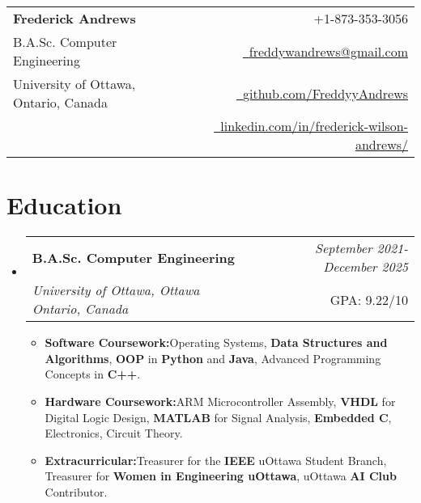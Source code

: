 \documentclass[a4paper,11pt]{article}
\makeatletter
\newcommand{\resumeItem}[2]{
  \item{
    \textbf{#1}{\hspace{0.5mm}#2 \vspace{-0.5mm}}
  }
}
\newcommand{\resumeSubheading}[4]{
\vspace{0.5mm}\item
    \begin{tabular*}{0.98\textwidth}[t]{l@{\extracolsep{\fill}}r}
        \textbf{#1} & \textit{\footnotesize{#4}} \\
        \textit{\footnotesize{#3}} &  \footnotesize{#2}\\
    \end{tabular*}
    \vspace{-2.4mm}
}
\newcommand{\resumeSubHeadingListStart}{\begin{itemize}[leftmargin=*,labelsep=0mm]}
\newcommand{\resumeItemListStart}{\begin{justify}\begin{itemize}[label=\textcolor{black}{--}, leftmargin=3ex, rightmargin=2ex, noitemsep,labelsep=1.2mm,itemsep=0mm]\small}
\newcommand{\resumeSubHeadingListEnd}{\end{itemize}\vspace{2mm}}
\newcommand{\resumeItemListEnd}{\end{itemize}\end{justify}\vspace{-2mm}}
\newcommand{\name}{Frederick Andrews} %
\newcommand{\phone}{873-353-3056} %
\newcommand{\emaila}{freddywandrews@gmail.com} %
\makeatother
\begin{document}
\selectfont
{}

\setlength{\footskip}{5pt}



{
\begin{tabularx}{\linewidth}{L r} \\
  \textbf{\Large \name} & {\raisebox{0.0\height}{\footnotesize \faPhone}\ +1-\phone}\\
  B.A.Sc. Computer Engineering  & \href{mailto:\emaila}{\raisebox{0.0\height}{\footnotesize \faEnvelope}\ {\emaila}} \\
  {University of Ottawa, Ontario, Canada}& \href{https://github.com/FreddyyAndrews}{\raisebox{0.0\height}{\footnotesize \faGithub}\ {github.com/FreddyyAndrews}} \\  
& \href{https://www.linkedin.com/in/frederick-wilson-andrews/}{\raisebox{0.0\height}{\footnotesize \faLinkedin}\ {linkedin.com/in/frederick-wilson-andrews/}}
\end{tabularx}
}
\vspace{-8mm}

\section{\textbf{Education}}
  \resumeSubHeadingListStart
    \resumeSubheading
      {B.A.Sc. Computer Engineering}{GPA: 9.22/10}
      {University of Ottawa, Ottawa Ontario, Canada}{September 2021- December 2025}
      \resumeItemListStart
      \vspace{1.0mm}
        \resumeItem{Software Coursework:}
          {Operating Systems, \textbf{Data Structures and Algorithms}, \textbf{OOP} in \textbf{Python} and \textbf{Java}, Advanced Programming Concepts in \textbf{C++}.}
          \vspace{1.0mm}
          \resumeItem{Hardware Coursework:}
          {ARM Microcontroller Assembly, \textbf{VHDL} for Digital Logic Design, \textbf{MATLAB} for Signal Analysis, \textbf{Embedded C}, Electronics, Circuit Theory.}
          \vspace{1.0mm}
          \resumeItem{Extracurricular:}
          {Treasurer for the \textbf{IEEE} uOttawa Student Branch, Treasurer for \textbf{Women in Engineering uOttawa}, uOttawa \textbf{AI Club} Contributor.}
      \resumeItemListEnd
  \resumeSubHeadingListEnd
\vspace{-8mm}
%
\end{document}
